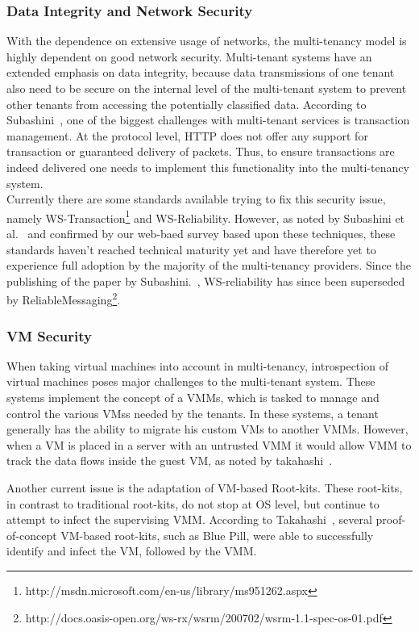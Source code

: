 \subsubsection{Data Integrity and Network Security}
With the dependence on extensive usage of networks, the multi-tenancy model is highly dependent on good network security.  
Multi-tenant systems have an extended emphasis on data integrity, because data transmissions of one tenant also need to be secure on the internal level of the multi-tenant system to prevent other tenants from accessing the potentially classified data.
According to Subashini~\cite{Subashini2011Security}, one of the biggest challenges with multi-tenant services is transaction management. 
At the protocol level, HTTP does not offer any support for transaction or guaranteed delivery of packets. 
Thus, to ensure transactions are indeed delivered one needs to implement this functionality into the multi-tenancy system.\\

Currently there are some standards available trying to fix this security issue, namely WS-Transaction\footnote{http://msdn.microsoft.com/en-us/library/ms951262.aspx} and WS-Reliability.
However, as noted by Subashini et al.~\cite{Subashini2011Security} and confirmed by our web-baed survey based upon these techniques, these standards haven’t reached technical maturity yet and have therefore yet to experience full adoption by the majority of the multi-tenancy providers.
Since the publishing of the paper by Subashini.~\cite{Subashini2011Security}, WS-reliability has since been superseded by ReliableMessaging\footnote{http://docs.oasis-open.org/ws-rx/wsrm/200702/wsrm-1.1-spec-os-01.pdf}.

\subsubsection{\acf{VM} Security}
When taking virtual machines into account in multi-tenancy, introspection of virtual machines poses major challenges to the multi-tenant system. 
These systems implement the concept of a \acp{VMM}, which is tasked to manage and control the various \acp{VM}s needed by the tenants.
In these systems, a tenant generally has the ability to migrate his custom \acp{VM} to another \acp{VMM}. 
However, when a \ac{VM} is placed in a server with an untrusted \ac{VMM} it would allow \ac{VMM} to track the data flows inside the guest VM, as noted by takahashi~\cite{Takahashi2012Security}.

Another current issue is the adaptation of VM-based Root-kits. 
These root-kits, in contrast to traditional root-kits, do not stop at OS level, but continue to attempt to infect the supervising \ac{VMM}. 
According to Takahashi~\cite{Takahashi2012Security}, several proof-of-concept VM-based root-kits, such as Blue Pill, were able to successfully identify and infect the VM, followed by the \ac{VMM}.

